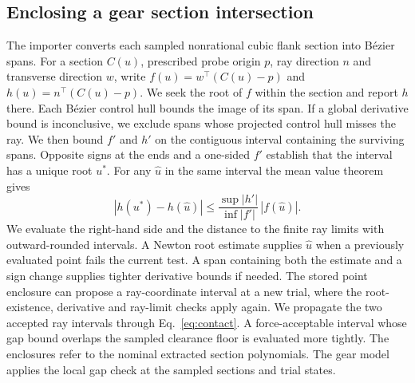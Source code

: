 \subsection{Enclosing a gear section intersection}
\label{sec:gear-root}
The importer converts each sampled nonrational cubic flank section into B\'ezier spans. For a section $C(u)$, prescribed probe origin $p$, ray direction $n$ and transverse direction $w$, write $f(u)=w^\top(C(u)-p)$ and $h(u)=n^\top(C(u)-p)$. We seek the root of $f$ within the section and report $h$ there. Each B\'ezier control hull bounds the image of its span. If a global derivative bound is inconclusive, we exclude spans whose projected control hull misses the ray. We then bound $f'$ and $h'$ on the contiguous interval containing the surviving spans. Opposite signs at the ends and a one-sided $f'$ establish that the interval has a unique root $u^*$. For any $\hat u$ in the same interval the mean value theorem gives
\begin{equation}
 |h(u^*)-h(\hat u)| \leq \frac{\sup |h'|}{\inf |f'|}\, |f(\hat u)|.
 \label{eq:probe-error}
\end{equation}
We evaluate the right-hand side and the distance to the finite ray limits with outward-rounded intervals. A Newton root estimate supplies $\hat u$ when a previously evaluated point fails the current test. A span containing both the estimate and a sign change supplies tighter derivative bounds if needed. The stored point enclosure can propose a ray-coordinate interval at a new trial, where the root-existence, derivative and ray-limit checks apply again. We propagate the two accepted ray intervals through Eq.~\eqref{eq:contact}. A force-acceptable interval whose gap bound overlaps the sampled clearance floor is evaluated more tightly. The enclosures refer to the nominal extracted section polynomials. The gear model applies the local gap check at the sampled sections and trial states.

